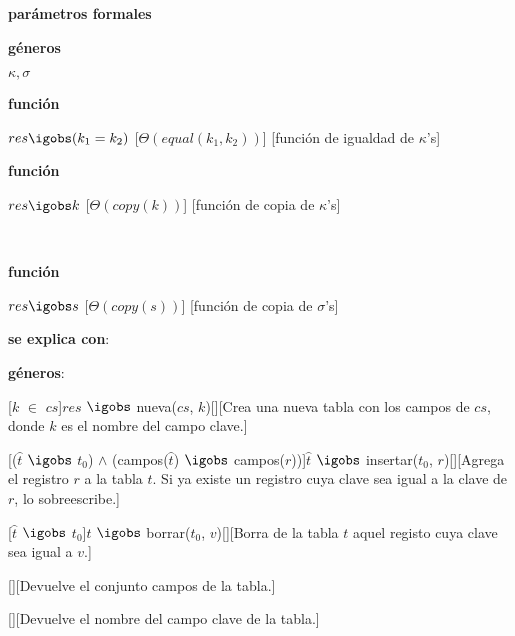 \documentclass[a4paper,10pt]{article}
\begin{document}
\begin{Interfaz}

  \textbf{parámetros formales}\parindent\\
  \parbox{1.7cm}{\textbf{géneros}}$\kappa,\sigma$\\
  \parbox[t]{1.7cm}{\textbf{función}}\parbox[t]{.5\textwidth-\parindent-1.7cm}{%
    {$res \igobs (k_1 = k_2)$}
    [$\Theta(equal(k_1, k_2))$]
    [función de igualdad de $\kappa$'s]
  }%
  \parbox[t]{1.7cm}{\textbf{función}}\parbox[t]{.5\textwidth-\parindent-1.7cm}{%
    {$res \igobs k$}
    [$\Theta(copy(k))$]
    [función de copia de $\kappa$'s]
  }\\[2ex]
  \parbox[t]{1.7cm}{\textbf{función}}\parbox[t]{.5\textwidth-\parindent-1.7cm}{%
    {$res \igobs s$}
    [$\Theta(copy(s))$]
    [función de copia de $\sigma$'s]
  }

    \textbf{se explica con}: 

    \textbf{géneros}: 


   [$k$ $\in$ $cs$]{$res$ $\igobs$ nueva($cs$, $k$)}[][Crea una nueva tabla con los campos de $cs$, donde $k$ es el nombre del campo clave.]

    [($\widehat{t}$ $\igobs$ $t_0$) $\land$ (campos($\widehat{t}$) $\igobs$ campos($r$))]{$\widehat{t}$ $\igobs$ insertar($t_0$, $r$)}[][Agrega el registro $r$ a la tabla $t$. Si ya existe un registro cuya clave sea igual a la clave de $r$, lo sobreescribe.]

    [$\widehat{t}$ $\igobs$ $t_0$]{$\widehat{t}$ $\igobs$ borrar($t_0$, $v$)}[][Borra de la tabla $t$ aquel registo cuya clave sea igual a $v$.]

    [][Devuelve el conjunto campos de la tabla.]

    [][Devuelve el nombre del campo clave de la tabla.]


\end{Interfaz}
\end{document}
